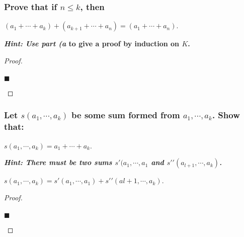 \documentclass[letterpaper, 10 pt, conference]{ieeeconf}  %
\begin{document}
\begin{mdframed}
\subsubsection{\textbf{Prove that if $n \leq k$, then}}

\begin{center}
    $(a_1 + \cdots + a_k) + (a_{k+1} + \cdots + a_n) = (a_1 + \cdots + a_n)$. 
\end{center}

\textbf{\textit{Hint: Use part (a} to give a proof by induction on $K$.}
\end{mdframed}

\begin{proof}
\begin{align}
    
\end{align}
\begin{flushright}
$\blacksquare$
\end{flushright}
\end{proof}

\begin{mdframed}
\subsubsection{\textbf{Let $s(a_1, \cdots, a_k)$ be some sum formed from $a_1, \cdots, a_k$. Show that:}}

\begin{center}
    $s(a_1, \cdots, a_k) = a_1 + \cdots + a_k$.
\end{center}

\textbf{\textit{Hint: There must be two sums $s\prime(a_1, \cdots, a_1$ and $s\prime\prime(a_{l+1}, \cdots, a_k)$.}}

\begin{center}
    $s(a_1, \cdots, a_k) = s\prime(a_1, \cdots, a_1) + s\prime\prime(a{l+1}, \cdots, a_k)$.
\end{center}
\end{mdframed}
\begin{proof}
\begin{align}
    
\end{align}
\begin{flushright}
$\blacksquare$
\end{flushright}
\end{proof}
\end{document}
